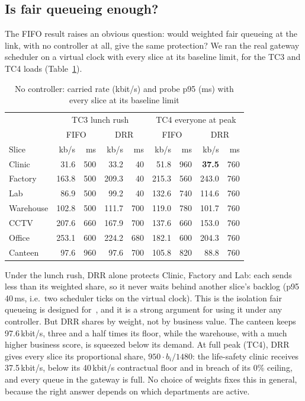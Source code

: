 \documentclass[conference]{IEEEtran}
\newcommand{\kbps}{\,kbit/s}
\begin{document}
\subsection{Is fair queueing enough?}
\label{sec:drr}

The FIFO result raises an obvious question: would weighted fair queueing at the link, with no controller at all, give the same protection? We ran the real gateway scheduler on a virtual clock with every slice at its baseline limit, for the TC3 and TC4 loads (Table~\ref{tab:drr}).

\begin{table}[t]
\caption{No controller: carried rate (kbit/s) and probe p95 (ms) with every slice at its baseline limit}
\label{tab:drr}
\centering
\footnotesize
\setlength{\tabcolsep}{2.6pt}
\begin{tabular}{@{}lrrrr|rrrr@{}}
\toprule
 & \multicolumn{4}{c|}{TC3 lunch rush} & \multicolumn{4}{c}{TC4 everyone at peak} \\
 & \multicolumn{2}{c}{FIFO} & \multicolumn{2}{c|}{DRR} & \multicolumn{2}{c}{FIFO} & \multicolumn{2}{c}{DRR} \\
Slice & kb/s & ms & kb/s & ms & kb/s & ms & kb/s & ms \\
\midrule
Clinic & 31.6 & 500 & 33.2 & 40 & 51.8 & 960 & \textbf{37.5} & 760 \\
Factory & 163.8 & 500 & 209.3 & 40 & 215.3 & 560 & 243.0 & 760 \\
Lab & 86.9 & 500 & 99.2 & 40 & 132.6 & 740 & 114.6 & 760 \\
Warehouse & 102.8 & 500 & 111.7 & 700 & 119.0 & 780 & 101.7 & 760 \\
CCTV & 207.6 & 660 & 167.9 & 700 & 137.6 & 660 & 153.0 & 760 \\
Office & 253.1 & 600 & 224.2 & 680 & 182.1 & 600 & 204.3 & 760 \\
Canteen & 97.6 & 960 & 97.6 & 700 & 105.8 & 820 & 88.8 & 760 \\
\bottomrule
\end{tabular}
\end{table}

Under the lunch rush, DRR alone protects Clinic, Factory and Lab: each sends less than its weighted share, so it never waits behind another slice's backlog (p95 40\,ms, i.e.\ two scheduler ticks on the virtual clock). This is the isolation fair queueing is designed for~\cite{demers1989,shreedhar1996}, and it is a strong argument for using it under any controller. But DRR shares by weight, not by business value. The canteen keeps 97.6\kbps{}, three and a half times its floor, while the warehouse, with a much higher business score, is squeezed below its demand. At full peak (TC4), DRR gives every slice its proportional share, $950 \cdot b_i / 1480$: the life-safety clinic receives 37.5\kbps{}, below its 40\kbps{} contractual floor and in breach of its 0\% ceiling, and every queue in the gateway is full. No choice of weights fixes this in general, because the right answer depends on which departments are active.
\end{document}
